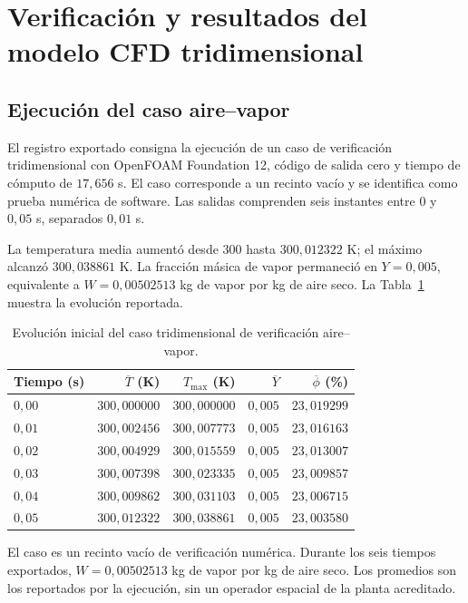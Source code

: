 \FloatBarrier

\section{Verificación y resultados del modelo CFD tridimensional}
\label{res:cfd}

\subsection{Ejecución del caso aire--vapor}

El registro exportado consigna la ejecución de un caso de verificación tridimensional con OpenFOAM Foundation 12, código de salida cero y tiempo de cómputo de $17{,}656$ s. El caso corresponde a un recinto vacío y se identifica como prueba numérica de software. Las salidas comprenden seis instantes entre $0$ y $0{,}05$ s, separados $0{,}01$ s.

La temperatura media aumentó desde $300$ hasta $300{,}012322$ K; el máximo alcanzó $300{,}038861$ K. La fracción másica de vapor permaneció en $Y=0{,}005$, equivalente a $W=0{,}00502513$ kg de vapor por kg de aire seco. La Tabla~\ref{tab:res_cfd} muestra la evolución reportada.

\begin{table}[htbp]
\centering
\caption{Evolución inicial del caso tridimensional de verificación aire--vapor.}
\label{tab:res_cfd}
\small
\setlength{\tabcolsep}{5pt}
\begin{tabular}{lrrrr}
\toprule
Tiempo (s) & $\overline T$ (K) & $T_{\max}$ (K) & $\overline Y$ & $\overline\phi$ (\%) \\
\midrule
$0{,}00$ & $300{,}000000$ & $300{,}000000$ & $0{,}005$ & $23{,}019299$ \\
$0{,}01$ & $300{,}002456$ & $300{,}007773$ & $0{,}005$ & $23{,}016163$ \\
$0{,}02$ & $300{,}004929$ & $300{,}015559$ & $0{,}005$ & $23{,}013007$ \\
$0{,}03$ & $300{,}007398$ & $300{,}023335$ & $0{,}005$ & $23{,}009857$ \\
$0{,}04$ & $300{,}009862$ & $300{,}031103$ & $0{,}005$ & $23{,}006715$ \\
$0{,}05$ & $300{,}012322$ & $300{,}038861$ & $0{,}005$ & $23{,}003580$ \\
\bottomrule
\end{tabular}
\par\vspace{3pt}
\begin{minipage}{0.98\textwidth}\footnotesize
El caso es un recinto vacío de verificación numérica. Durante los seis tiempos exportados, $W=0{,}00502513$ kg de vapor por kg de aire seco. Los promedios son los reportados por la ejecución, sin un operador espacial de la planta acreditado.
\end{minipage}
\end{table}


